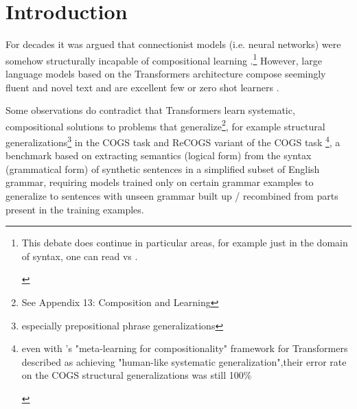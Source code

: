 \documentclass[11pt]{article}
\begin{document}
\section{Introduction}
For decades it was argued that connectionist models (i.e. neural networks) were somehow structurally incapable of compositional learning \cite{FodorPylyshyn1988}.\footnote{
\begin{tiny}
This debate does continue in particular areas, for example just in the domain of syntax, one can read \cite{vanschijndel2019quantitydoesntbuyquality} vs \cite{goldberg2019assessingbertssyntacticabilities}.
\end{tiny}
} 
However, large language models based on the Transformers architecture compose seemingly fluent and novel text and are excellent few or zero shot learners \cite{Brown2020}.

Some observations do contradict that Transformers learn systematic, compositional solutions to problems that generalize\footnote{See Appendix 13: Composition and Learning}, for example structural generalizations\footnote{especially prepositional phrase generalizations} in the COGS task and ReCOGS \cite{Wu2023} variant of the COGS task \cite{KimLinzen2020}\footnote{
\begin{tiny}
even with \cite{lake2023human}'s "meta-learning for compositionality" framework for Transformers described as achieving "human-like systematic generalization",their error rate on the COGS structural generalizations was still 100\%
\end{tiny}
}, a benchmark based on extracting semantics (logical form) from the syntax (grammatical form) of synthetic sentences in a simplified subset of English grammar, requiring models trained only on certain grammar examples to generalize to sentences with unseen grammar built up / recombined from parts present in the training examples.
\end{document}
